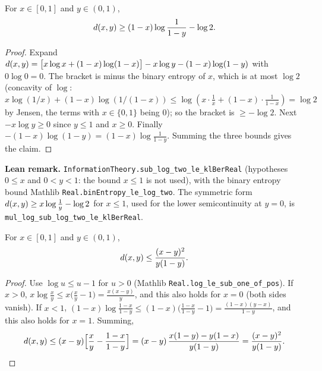\begin{lemma}\label{lem:klbin_lower}
\leanok
{}
For $x \in [0, 1]$ and $y \in (0, 1)$,
\[
  d(x, y) \ge (1 - x)\log\frac{1}{1 - y} - \log 2 .
\]
\end{lemma}

\begin{proof}
\leanok
Expand $d(x, y) = \big[x\log x + (1-x)\log(1-x)\big] - x\log y - (1 - x)\log(1 - y)$ with
$0 \log 0 = 0$. The bracket is minus the binary entropy of $x$, which is at most $\log 2$
(concavity of $\log$: $x\log(1/x) + (1-x)\log(1/(1-x)) \le \log(x \cdot \tfrac1x + (1-x)\cdot\tfrac1{1-x}) = \log 2$
by Jensen, the terms with $x \in \{0,1\}$ being $0$); so the bracket is $\ge -\log 2$. Next
$-x\log y \ge 0$ since $y \le 1$ and $x \ge 0$. Finally
$-(1-x)\log(1-y) = (1-x)\log\frac{1}{1-y}$. Summing the three bounds gives the claim.
\end{proof}

\textbf{Lean remark.} \texttt{InformationTheory.sub\_log\_two\_le\_klBerReal} (hypotheses
$0 \le x$ and $0 < y < 1$: the bound $x \le 1$ is not used), with the binary entropy bound Mathlib
\texttt{Real.binEntropy\_le\_log\_two}. The symmetric form
$d(x, y) \ge x\log\frac1y - \log 2$ for $x \le 1$, used for the lower semicontinuity at
$y = 0$, is \texttt{mul\_log\_sub\_log\_two\_le\_klBerReal}.

\begin{lemma}\label{lem:klbin_upper}
\leanok
{}
For $x \in [0, 1]$ and $y \in (0, 1)$,
\[
  d(x, y) \le \frac{(x - y)^2}{y(1 - y)} .
\]
\end{lemma}

\begin{proof}
\leanok
Use $\log u \le u - 1$ for $u > 0$ (Mathlib \texttt{Real.log\_le\_sub\_one\_of\_pos}). If
$x > 0$, $x\log\frac{x}{y} \le x\big(\frac{x}{y} - 1\big) = \frac{x(x - y)}{y}$, and this also
holds for $x = 0$ (both sides vanish). If $x < 1$,
$(1-x)\log\frac{1-x}{1-y} \le (1-x)\big(\frac{1-x}{1-y} - 1\big) = \frac{(1-x)(y - x)}{1-y}$, and
this also holds for $x = 1$. Summing,
\[
  d(x, y) \le (x - y)\Big[\frac{x}{y} - \frac{1 - x}{1 - y}\Big]
  = (x - y)\,\frac{x(1-y) - y(1-x)}{y(1-y)} = \frac{(x - y)^2}{y(1-y)} .
\]
\end{proof}

